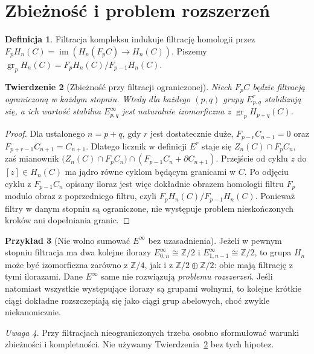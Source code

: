 \documentclass[11pt,a4paper,oneside]{report}
\newcommand{\Z}{\mathbb{Z}}
\theoremstyle{plain}
\newtheorem{twierdzenie}{Twierdzenie}[section]
\theoremstyle{definition}
\newtheorem{definicja}[twierdzenie]{Definicja}
\newtheorem{przyklad}[twierdzenie]{Przykład}
\theoremstyle{remark}
\newtheorem{uwaga}[twierdzenie]{Uwaga}
\begin{document}
\section{Zbieżność i problem rozszerzeń}
\begin{definicja}
Filtracja kompleksu indukuje filtrację homologii przez
$F_pH_n(C)=\operatorname{im}(H_n(F_pC)\to H_n(C))$.
Piszemy $\operatorname{gr}_pH_n(C)=F_pH_n(C)/F_{p-1}H_n(C)$.
\end{definicja}
\begin{twierdzenie}[Zbieżność przy filtracji ograniczonej]
\label{thm:convergence-v5}
Niech $F_pC$ będzie filtracją ograniczoną w każdym stopniu.
Wtedy dla każdego $(p,q)$ grupy $E^r_{p,q}$ stabilizują się,
a ich wartość stabilna $E^\infty_{p,q}$ jest naturalnie
izomorficzna z $\operatorname{gr}_pH_{p+q}(C)$.
\end{twierdzenie}
\begin{proof}
Dla ustalonego $n=p+q$, gdy $r$ jest dostatecznie duże,
$F_{p-r}C_{n-1}=0$ oraz $F_{p+r-1}C_{n+1}=C_{n+1}$.
Dlatego licznik w definicji $E^r$ staje się
$Z_n(C)\cap F_pC_n$, zaś mianownik
$\bigl(Z_n(C)\cap F_pC_n\bigr)\cap
(F_{p-1}C_n+\partial C_{n+1})$.
Przejście od cyklu $z$ do $[z]\in H_n(C)$
ma jądro równe cyklom będącym granicami w $C$.
Po odjęciu cyklu z $F_{p-1}C_n$ opisany iloraz jest
więc dokładnie obrazem homologii filtru $F_p$ modulo
obraz z poprzedniego filtru, czyli
$F_pH_n(C)/F_{p-1}H_n(C)$. Ponieważ filtry w danym
stopniu są ograniczone, nie występuje problem nieskończonych
kroków ani dopełniania granic.
\end{proof}
\begin{przyklad}[Nie wolno sumować $E^\infty$ bez uzasadnienia]
Jeżeli w pewnym stopniu filtracja ma dwa kolejne ilorazy
$E^\infty_{0,n}\cong\Z/2$ i
$E^\infty_{1,n-1}\cong\Z/2$, to grupa $H_n$ może być
izomorficzna zarówno z $\Z/4$, jak i z
$\Z/2\oplus\Z/2$: obie mają filtrację z tymi ilorazami.
Dane $E^\infty$ same nie rozwiązują \emph{problemu rozszerzeń}.
Jeśli natomiast wszystkie występujące ilorazy są grupami wolnymi,
to kolejne krótkie ciągi dokładne rozszczepiają się jako ciągi
grup abelowych, choć zwykle niekanonicznie.
\end{przyklad}
\begin{uwaga}
Przy filtracjach nieograniczonych trzeba osobno sformułować
warunki zbieżności i kompletności. Nie używamy
Twierdzenia~\ref{thm:convergence-v5} bez tych hipotez.
\end{uwaga}
\end{document}
